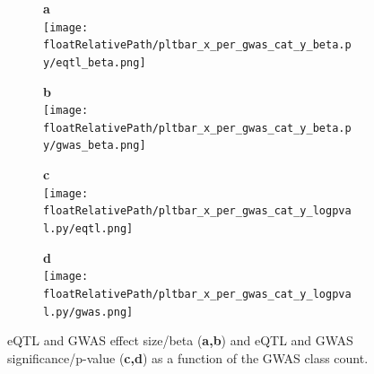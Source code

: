 %
\begin{figure}[!tbp]
\centering
%
\begin{subfigure}[]{.33\textwidth}
\textbf{a}
\\
\texttt{[image: \\floatRelativePath/pltbar\_x\_per\_gwas\_cat\_y\_beta.py/eqtl\_beta.png]}
\end{subfigure}
%
\begin{subfigure}[]{.33\textwidth}
\textbf{b}
\\
\texttt{[image: \\floatRelativePath/pltbar\_x\_per\_gwas\_cat\_y\_beta.py/gwas\_beta.png]}
\end{subfigure}

\begin{subfigure}[]{.33\textwidth}
\textbf{c}
\\
\texttt{[image: \\floatRelativePath/pltbar\_x\_per\_gwas\_cat\_y\_logpval.py/eqtl.png]}
\end{subfigure}
%
\begin{subfigure}[]{.33\textwidth}
\textbf{d}
\\
\texttt{[image: \\floatRelativePath/pltbar\_x\_per\_gwas\_cat\_y\_logpval.py/gwas.png]}
\end{subfigure}

\caption{eQTL and GWAS effect size/beta (\textbf{a,b}) and eQTL and GWAS significance/p-value (\textbf{c,d}) as a function of the GWAS class count.} \label{fig:beta_pval}
%
\end{figure}

